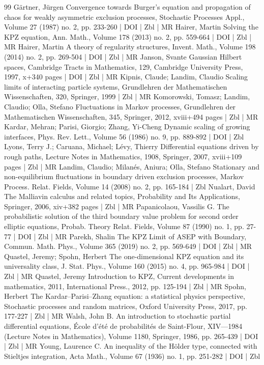 \begin{thebibliography}{99}
Gärtner, Jürgen Convergence towards Burger’s equation and propagation of chaos for weakly asymmetric exclusion processes, Stochastic Processes Appl., Volume 27 (1987) no. 2, pp. 233-260 | DOI | Zbl | MR
Hairer, Martin Solving the KPZ equation, Ann. Math., Volume 178 (2013) no. 2, pp. 559-664 | DOI | Zbl | MR
Hairer, Martin A theory of regularity structures, Invent. Math., Volume 198 (2014) no. 2, pp. 269-504 | DOI | Zbl | MR
Janson, Svante Gaussian Hilbert spaces, Cambridge Tracts in Mathematics, 129, Cambridge University Press, 1997, x+340 pages | DOI | Zbl | MR
Kipnis, Claude; Landim, Claudio Scaling limits of interacting particle systems, Grundlehren der Mathematischen Wissenschaften, 320, Springer, 1999 | Zbl | MR
Komorowski, Tomasz; Landim, Claudio; Olla, Stefano Fluctuations in Markov processes, Grundlehren der Mathematischen Wissenschaften, 345, Springer, 2012, xviii+494 pages | Zbl | MR
Kardar, Mehran; Parisi, Giorgio; Zhang, Yi-Cheng Dynamic scaling of growing interfaces, Phys. Rev. Lett., Volume 56 (1986) no. 9, pp. 889-892 | DOI | Zbl
Lyons, Terry J.; Caruana, Michael; Lévy, Thierry Differential equations driven by rough paths, Lecture Notes in Mathematics, 1908, Springer, 2007, xviii+109 pages | Zbl | MR
Landim, Claudio; Milanés, Aniura; Olla, Stefano Stationary and non-equilibrium fluctuations in boundary driven exclusion processes, Markov Process. Relat. Fields, Volume 14 (2008) no. 2, pp. 165-184 | Zbl
Nualart, David The Malliavin calculus and related topics, Probability and Its Applications, Springer, 2006, xiv+382 pages | Zbl | MR
Papanicolaou, Vassilis G. The probabilistic solution of the third boundary value problem for second order elliptic equations, Probab. Theory Relat. Fields, Volume 87 (1990) no. 1, pp. 27-77 | DOI | Zbl | MR
Parekh, Shalin The KPZ Limit of ASEP with Boundary, Commun. Math. Phys., Volume 365 (2019) no. 2, pp. 569-649 | DOI | Zbl | MR
Quastel, Jeremy; Spohn, Herbert The one-dimensional KPZ equation and its universality class, J. Stat. Phys., Volume 160 (2015) no. 4, pp. 965-984 | DOI | Zbl | MR
Quastel, Jeremy Introduction to KPZ, Current developments in mathematics, 2011, International Press., 2012, pp. 125-194 | Zbl | MR
Spohn, Herbert The Kardar–Parisi–Zhang equation: a statistical physics perspective, Stochastic processes and random matrices, Oxford University Press, 2017, pp. 177-227 | Zbl | MR
Walsh, John B. An introduction to stochastic partial differential equations, École d’été de probabilités de Saint-Flour, XIV—1984 (Lecture Notes in Mathematics), Volume 1180, Springer, 1986, pp. 265-439 | DOI | Zbl | MR
Young, Laurence C. An inequality of the Hölder type, connected with Stieltjes integration, Acta Math., Volume 67 (1936) no. 1, pp. 251-282 | DOI | Zbl
\end{thebibliography}
